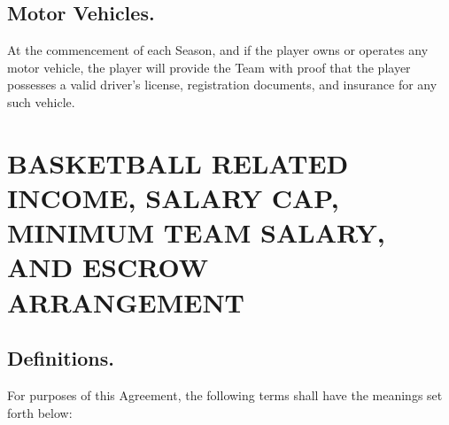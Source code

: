\documentclass[
]{book}
\begin{document}
\hypertarget{motor-vehicles.}{%
\section{Motor Vehicles.}\label{motor-vehicles.}}

At the commencement of each Season, and if the player owns or operates any motor vehicle, the player will provide the Team with proof that the player possesses a valid driver's license, registration documents, and insurance for any such vehicle.

\hypertarget{basketball-related-income-salary-cap-minimum-team-salary-and-escrow-arrangement}{%
\chapter{BASKETBALL RELATED INCOME, SALARY CAP, MINIMUM TEAM SALARY, AND ESCROW ARRANGEMENT}\label{basketball-related-income-salary-cap-minimum-team-salary-and-escrow-arrangement}}


\hypertarget{definitions.-1}{%
\section{Definitions.}\label{definitions.-1}}

For purposes of this Agreement, the following terms shall have the meanings set forth below:
\end{document}
